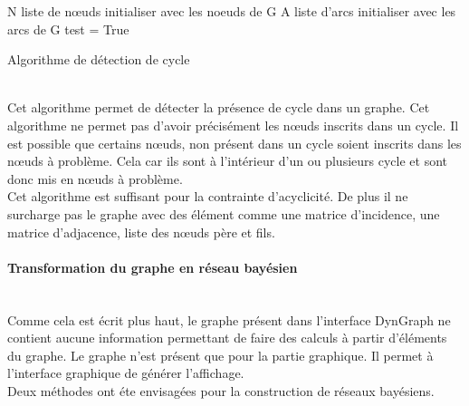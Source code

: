 \documentclass[conference]{IEEEtran}
\begin{document}
 \begin{algorithm}[H]
 N liste de nœuds initialiser avec les noeuds de G\;
 A liste d'arcs initialiser avec les arcs de G\;
 test = True\;
\caption{Algorithme de détection de cycle}
\end{algorithm}
\\
Cet algorithme permet de détecter la présence de cycle dans un graphe. Cet algorithme ne permet pas d'avoir précisément les nœuds inscrits dans un cycle. Il est possible que certains nœuds, non présent dans un cycle soient inscrits dans les nœuds à problème. Cela car ils sont à l'intérieur d'un ou plusieurs cycle et sont donc mis en nœuds à problème. \\
Cet algorithme est suffisant pour la contrainte d'acyclicité. De plus il ne surcharge pas le graphe avec des élément comme une matrice d'incidence, une matrice d'adjacence, liste des nœuds père et fils. \\

\paragraph{Transformation du graphe en réseau bayésien \hfill }
\\ Comme cela est écrit plus haut, le graphe présent dans l'interface DynGraph ne contient aucune information permettant de faire des calculs à partir d'éléments du graphe. Le graphe n'est présent que pour la partie graphique. Il permet à l'interface graphique de générer l'affichage.\\
Deux méthodes ont éte envisagées pour la construction de réseaux bayésiens. \\
\end{document}
